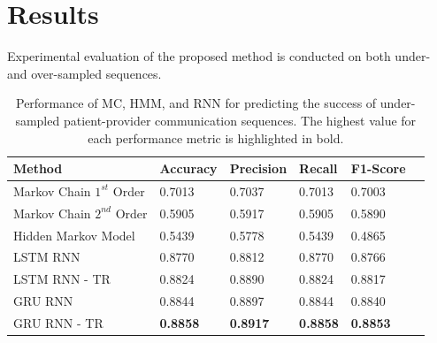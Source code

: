 \documentclass{amia_summit_2018}
\begin{document}
\section*{Results}
Experimental evaluation of the proposed method is conducted on both under- and over-sampled sequences. \\

\begin{table}[h]
\centering
\caption{Performance of MC, HMM, and RNN for predicting the success of under-sampled patient-provider communication sequences. The highest value for each performance metric is highlighted in bold.}
\label{tab:result_under_sampled}
  \begin{tabular}{|l|l|l|l|l|l|}
  \hline
   \textbf{Method} & \textbf{Accuracy}  & \textbf{Precision}  & \textbf{Recall} & \textbf{F1-Score}\\ \hline    
    
 Markov Chain $1^{st}$ Order & 0.7013 & 0.7037 & 0.7013 & 0.7003\\ \hline
 Markov Chain $2^{nd}$ Order & 0.5905 & 0.5917 & 0.5905 & 0.5890\\ \hline
 Hidden Markov Model & 0.5439 & 0.5778 & 0.5439 & 0.4865\\ \hline
 LSTM RNN & 0.8770 & 0.8812 & 0.8770 & 0.8766\\ \hline
 LSTM RNN - TR & 0.8824 & 0.8890 & 0.8824 & 0.8817\\ \hline
 GRU RNN & 0.8844 & 0.8897 & 0.8844 & 0.8840\\ \hline
 GRU RNN - TR & \textbf{0.8858} & \textbf{0.8917} & \textbf{0.8858} & \textbf{0.8853}\\ \hline 
  \end{tabular}
\end{table}  
\end{document}
